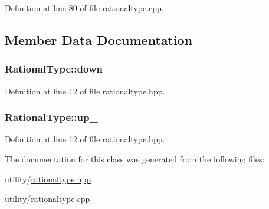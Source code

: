Definition at line 80 of file rationaltype.\+cpp.



\subsection{Member Data Documentation}
\hypertarget{class_rational_type_ac8ef6030f321ab6402d6469f860e7a05}{}
\subsubsection[{down\+\_\+}]{ Rational\+Type\+::down\+\_\+\hspace{0.3cm}{\ttfamily [private]}}\label{class_rational_type_ac8ef6030f321ab6402d6469f860e7a05}


Definition at line 12 of file rationaltype.\+hpp.

\hypertarget{class_rational_type_ab200b64618693ea1a166755f8d8bec63}{}
\subsubsection[{up\+\_\+}]{ Rational\+Type\+::up\+\_\+\hspace{0.3cm}{\ttfamily [private]}}\label{class_rational_type_ab200b64618693ea1a166755f8d8bec63}


Definition at line 12 of file rationaltype.\+hpp.



The documentation for this class was generated from the following files\+:\begin{DoxyCompactItemize}
\item 
utility/\hyperlink{rationaltype_8hpp}{rationaltype.\+hpp}\item 
utility/\hyperlink{rationaltype_8cpp}{rationaltype.\+cpp}\end{DoxyCompactItemize}

